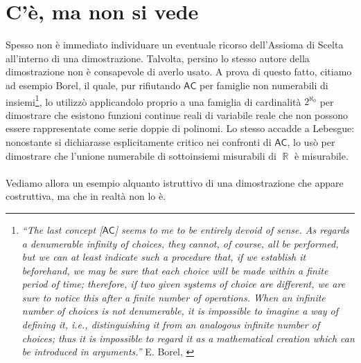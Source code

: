 \documentclass[12pt,a4paper]{report}
\theoremstyle{definition}
\theoremstyle{num.custom-title}
\DeclareMathOperator{\R}{\mathbb{R}}
\newcommand{\AC}{\ensuremath{\mathsf{AC}}\xspace}
\begin{document}
\section{C'è, ma non si vede}

Spesso non è immediato individuare un eventuale ricorso dell'Assioma di Scelta all'interno di una dimostrazione. Talvolta, persino lo stesso autore della dimostrazione non è consapevole di averlo usato. A prova di questo fatto, citiamo ad esempio Borel, il quale, pur rifiutando \AC per famiglie non numerabili di insiemi\footnote{\label{cit_borel}\emph{``The last concept [\AC] seems to me to be entirely devoid of sense. As regards a denumerable infinity of choices, they cannot, of course, all be performed, but we can at least indicate such a procedure that, if we establish it beforehand, we may be sure that each choice will be made within a finite period of time; therefore, if two given systems of choice are different, we are sure to notice this after a finite number of operations. When an infinite number of choices is not denumerable, it is impossible to imagine a way of defining it, i.e., distinguishing it from an analogous infinite number of choices; thus it is impossible to regard it as a mathematical creation which can be introduced in arguments.''} E. Borel, \cite{Bor14:Herrlich}}, lo utilizzò applicandolo proprio a una famiglia di cardinalità $2^{\aleph_0}$ per dimostrare che esistono funzioni continue reali di variabile reale che non possono essere rappresentate come serie doppie di polinomi. Lo stesso accadde a Lebesgue: nonostante si dichiarasse esplicitamente critico nei confronti di \AC, lo usò per dimostrare che l'unione numerabile di sottoinsiemi misurabili di $\R$ è misurabile.\\
\\
Vediamo allora un esempio alquanto istruttivo di una dimostrazione che appare costruttiva, ma che in realtà non lo è.
\end{document}
